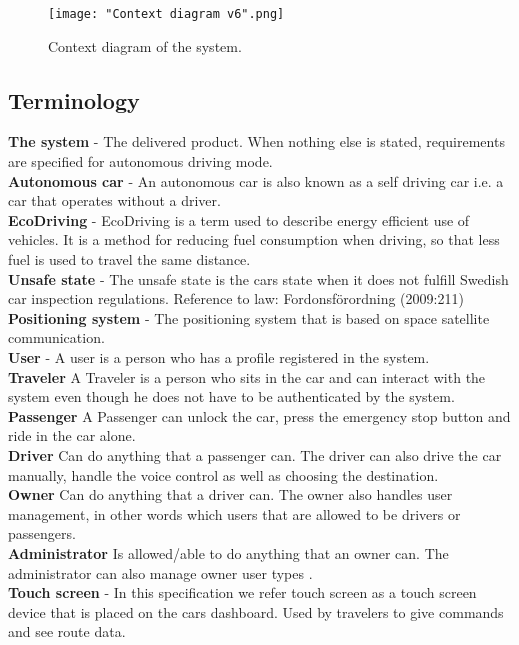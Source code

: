 \documentclass{article}
\begin{document}
\begin{figure}[htb]    
 \centering
  \texttt{[image: "Context diagram v6".png]}%
  \caption{Context diagram of the system.}
  \label{ContextDiagram}
\end{figure}
\bigskip

\subsection{Terminology}
\noindent\textbf{The system} - The delivered product. When nothing else is stated, requirements are specified for autonomous driving mode.\\
\textbf{Autonomous car} - An autonomous car is also known as a self driving car i.e. a car that operates without a driver. \\
\textbf{EcoDriving} - EcoDriving is a term used to describe energy efficient use of vehicles. It is a method for reducing fuel consumption when driving, so that less fuel is used to travel the same distance.\\
\textbf{Unsafe state} - The unsafe state is the cars state when it does not fulfill Swedish car inspection regulations.
Reference to law: Fordonsförordning (2009:211) \\
\textbf{Positioning system} - The positioning system that is based on space satellite communication.\\
\textbf{User} - A user is a person who has a profile registered in the system. \\
\textbf{Traveler} A Traveler is a person who sits in the car and can interact with the system even though he does not have to be authenticated by the system.\\
\textbf{Passenger} A Passenger can unlock the car, press the emergency stop button and ride in the car alone.\\
\textbf{Driver} Can do anything that a passenger can.
The driver can also drive the car manually, handle the voice control as well as choosing the destination. \\
\textbf{Owner} Can do anything that a driver can. The owner also handles user management, in other words which users that are allowed to be drivers or passengers. \\
\textbf{Administrator} Is allowed/able to do anything that an owner can. The administrator can also manage owner user types . \\
\textbf{Touch screen} - In this specification we refer touch screen as a touch screen device that is placed on the cars dashboard. Used by travelers to  give commands and see route data. \\
\end{document}
